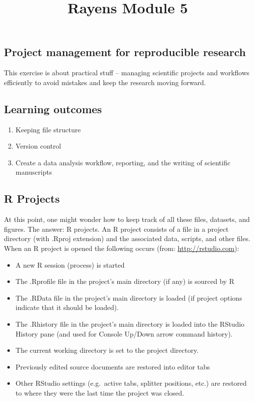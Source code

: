 \documentclass[]{article}
\title{Rayens Module 5}
\author{}
\date{}
\providecommand{\tightlist}{%
  \setlength{\itemsep}{0pt}\setlength{\parskip}{0pt}}
\begin{document}
\maketitle

\hypertarget{project-management-for-reproducible-research}{%
\subsection{Project management for reproducible
research}\label{project-management-for-reproducible-research}}

This exercise is about practical stuff -- managing scientific projects
and workflows efficiently to avoid mistakes and keep the research moving
forward.

\hypertarget{learning-outcomes}{%
\subsection{Learning outcomes}\label{learning-outcomes}}

\begin{enumerate}
\def\labelenumi{\arabic{enumi}.}
\item
  Keeping file structure
\item
  Version control
\item
  Create a data analysis workflow, reporting, and the writing of
  scientific manuscripts
\end{enumerate}

\hypertarget{r-projects}{%
\subsection{R Projects}\label{r-projects}}

At this point, one might wonder how to keep track of all these files,
datasets, and figures. The answer: R projects. An R project consists of
a file in a project directory (with .Rproj extension) and the associated
data, scripts, and other files. When an R project is opened the
following occurs (from: \url{http://rstudio.com}):

\begin{itemize}
\tightlist
\item
  A new R session (process) is started
\item
  The .Rprofile file in the project's main directory (if any) is sourced
  by R
\item
  The .RData file in the project's main directory is loaded (if project
  options indicate that it should be loaded).
\item
  The .Rhistory file in the project's main directory is loaded into the
  RStudio History pane (and used for Console Up/Down arrow command
  history).
\item
  The current working directory is set to the project directory.
\item
  Previously edited source documents are restored into editor tabs
\item
  Other RStudio settings (e.g.~active tabs, splitter positions, etc.)
  are restored to where they were the last time the project was closed.
\end{itemize}
\end{document}
